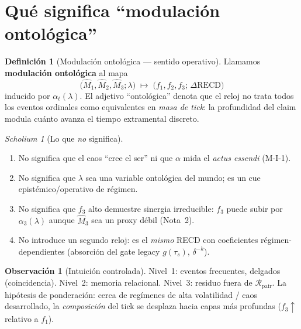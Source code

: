 \documentclass[11pt,a4paper]{article}
\theoremstyle{definition}
\newtheorem{definition}{Definici\'on}[section]
\newtheorem{remark}{Observaci\'on}[section]
\theoremstyle{plain}
\theoremstyle{remark}
\newtheorem{scholium}{Scholium}[section]
\newcommand{\RECD}{\mathrm{RECD}}
\newcommand{\Rpair}{\mathcal{R}_{\mathrm{pair}}}
\begin{document}
\section{Qu\'e significa ``modulación ontológica''}
\label{sec:meaning}

\begin{definition}[Modulación ontológica --- sentido operativo]
\label{def:mod}
Llamamos \textbf{modulación ontológica} al mapa
\begin{equation}
\bigl(\widehat{M}_1,\widehat{M}_2,\widehat{M}_3;\lambda\bigr)
\;\longmapsto\;
\bigl(f_1,f_2,f_3;\,\Delta\RECD\bigr)
\end{equation}
inducido por $\alpha_\ell(\lambda)$. El adjetivo ``ontológica'' denota
que el reloj no trata todos los eventos ordinales como equivalentes en
\emph{masa de tick}: la profundidad del claim modula cu\'anto avanza el
tiempo extramental discreto.
\end{definition}

\begin{scholium}[Lo que \emph{no} significa]
\label{sch:not}
\begin{enumerate}[label=(\roman*)]
  \item No significa que el caos ``cree el ser'' ni que $\alpha$ mida el
  \emph{actus essendi} (M-I-1).
  \item No significa que $\lambda$ sea una variable ontológica del
  mundo; es un cue epist\'emico/operativo de r\'egimen.
  \item No significa que $f_3$ alto demuestre sinergia irreducible: $f_3$
  puede subir por $\alpha_3(\lambda)$ aunque $\widehat{M}_3$ sea un proxy
  d\'ebil (Nota~2).
  \item No introduce un segundo reloj: es el \emph{mismo} RECD con
  coeficientes r\'egimen-dependientes (absorción del gate legacy
  $g(\tau_s)$, $\delta^{-k}$).
\end{enumerate}
\end{scholium}

\begin{remark}[Intuición controlada]
Nivel~1: eventos frecuentes, delgados (coincidencia).
Nivel~2: memoria relacional.
Nivel~3: residuo fuera de $\Rpair$.
La hip\'otesis de ponderación: cerca de regímenes de alta volatilidad /
caos desarrollado, la \emph{composici\'on} del tick se desplaza hacia
capas m\'as profundas ($f_3\uparrow$ relativo a $f_1$).
\end{remark}
\end{document}
